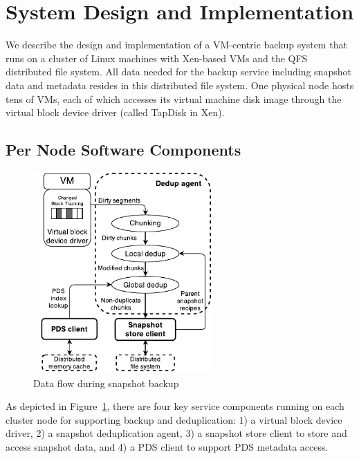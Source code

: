 \section{System Design and Implementation}
\label{sect:architecture}

We describe the design and implementation of a VM-centric backup system that
runs on a cluster of Linux machines with Xen-based VMs 
and the QFS~\cite{michael2013} distributed file system. 
All data needed for the backup service including snapshot data and metadata
resides in this distributed file system. 
One physical node hosts tens of VMs, each of which accesses its virtual machine disk image through the
virtual block device driver (called TapDisk\cite{Warfield2005} in Xen).

\subsection{Per Node Software Components} 
\begin{figure}[htbp]
    \centering
    \includegraphics[width=2.7in]{images/socc_arch_cluster}
    \caption{Data flow during snapshot backup}
    \label{fig:arch_vm}
\end{figure}
As depicted in Figure~\ref{fig:arch_vm}, 
there are four key service components running on each cluster
node  for supporting backup and deduplication: 
1) a virtual block device driver, 2) a snapshot deduplication agent,
3) a snapshot store client to store  and access snapshot data,
and 4)  a PDS client to support PDS metadata access. 

